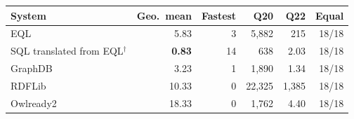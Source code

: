 \begin{tabular}{@{}lrrrrr@{}}
\toprule
\textbf{System} & \textbf{Geo.\ mean} & \textbf{Fastest} & \textbf{Q20} & \textbf{Q22} & \textbf{Equal}\\
\midrule
EQL & 5.83 & 3 & 5{,}882 & 215 & 18/18\\
SQL translated from EQL$^{\dagger}$ & \textbf{0.83} & 14 & 638 & 2.03 & 18/18\\
GraphDB & 3.23 & 1 & 1{,}890 & 1.34 & 18/18\\
RDFLib & 10.33 & 0 & 22{,}325 & 1{,}385 & 18/18\\
Owlready2 & 18.33 & 0 & 1{,}762 & 4.40 & 18/18\\
\bottomrule
\end{tabular}
